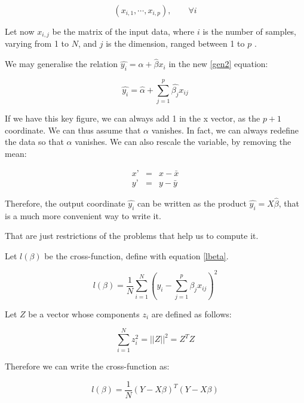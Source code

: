 \documentclass[a4paper]{tufte-book}
\begin{document}
\begin{equation}
    (x_{i,1}, \cdots , x_{i,p}), \qquad \forall i
    \label{pdim}
\end{equation}

Let now $x_{i,j}$ be the matrix of the input data, where $i$ is the number of
samples, varying from 1 to $N$, and $j$ is the dimension, ranged between 1 to $p$
.

We may generalise the relation $\hat{y_i} = \hat{\alpha} + \hat{\beta}x_i$ in the
new \ref{gen2} equation: 

\begin{equation} 
    \hat{y_i} = \hat{\alpha} + \sum_{j=1}^p \hat{\beta_j} x_{ij}
    \label{gen2}
\end{equation}

If we have this key figure, we can always add 1 in the x vector, as the $p+1$
coordinate. We can thus assume that $\alpha$ vanishes. In fact, we can always
redefine the data so that $\alpha$ vanishes. We can also rescale the variable, by
removing the mean:

\begin{eqnarray}
x’&=& x-\bar{x}\\
y’&=& y-\bar{y}
\end{eqnarray}

Therefore, the output coordinate $\hat{y_i}$ can be written as the product
$\hat{y_i} = X \hat{\beta}$, that is a much more convenient way to write it.

That are just restrictions of the problems that help us to compute it.

Let $l(\beta)$ be the cross-function, define with equation \ref{lbeta}.

\begin{equation}
    l(\beta) = \frac{1}{N} \sum_{i=1}^N \left( y_i - \sum_{j=1}^p \beta_j x_{ij} \right)^2
    \label{lbeta}
\end{equation}


Let $Z$ be a vector whose components $z_i$ are defined as follows:

\begin{equation}
    \sum_{i=1}^N z_i^2 = ||Z||^2 = Z^TZ
\end{equation}

Therefore we can write the cross-function as:

\begin{equation}
    l(\beta) = \frac{1}{N} (Y-X\beta)^T(Y-X\beta)
\end{equation}
\end{document}

